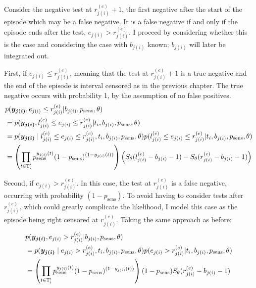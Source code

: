 \documentclass[thesis.tex]{subfiles}
\begin{document}
Consider the negative test at $r_{j(i)}^{(e)}+1$, the first negative after the start of the episode which may be a false negative.
It is a false negative if and only if the episode ends after the test, \ie $e_{j(i)} > r_{j(i)}^{(e)}$.
I proceed by considering whether this is the case and considering the case with $b_{j(i)}$ known; $b_{j(i)}$ will later be integrated out.

First, if $e_{j(i)} \leq r_{j(i)}^{(e)}$, meaning that the test at $r_{j(i)}^{(e)}+1$ is a true negative and the end of the episode is interval censored as in the previous chapter.
The true negative occurs with probability 1, by the assumption of no false positives.
\begin{align}
&p(\vec{y_{j(i)}}, e_{j(i)} \leq r_{j(i)}^{(e)} | b_{j(i)}, p_\text{sens}, \theta) \\
&= p(\vec{y_{j(i)}}, l_{j(i)}^{(e)} \leq e_{j(i)} \leq r_{j(i)}^{(e)} | t_i, b_{j(i)}, p_\text{sens}, \theta) \\ %
&= p(\vec{y_{j(i)}} \mid l_{j(i)}^{(e)} \leq e_{j(i)} \leq r_{j(i)}^{(e)}, t_i, b_{j(i)}, p_\text{sens}, \theta) p(l_{j(i)}^{(e)} \leq e_{j(i)} \leq r_{j(i)}^{(e)} | t_i, b_{j(i)}, p_\text{sens}, \theta) \\
&= \left( \prod_{t \in \sched'_i} p_\text{sens}^{y_{j(i)}(t)} (1 - p_\text{sens})^{(1 - y_{j(i)}(t))} \right) \left( S_\theta(l_{j(i)}^{(e)} - b_{j(i)} - 1) - S_\theta(r_{j(i)}^{(e)} - b_{j(i)} - 1) \right)
\label{imperf-test:eq:ll-ei-lt-ri}
\end{align}

Second, if $e_{j(i)} > r_{j(i)}^{(e)}$.
In this case, the test at $r_{j(i)}^{(e)}$ is a false negative, occurring with probability $(1 - p_\text{sens})$.
To avoid having to consider tests after $r_{j(i)}^{(e)}$, which could greatly complicate the likelihood, I model this case as the episode being right censored at $r_{j(i)}^{(e)}$.
Taking the same approach as before:
\begin{align}
&p(\bm{y_{j(i)}}, e_{j(i)} > r_{j(i)}^{(e)} | b_{j(i)}, p_\text{sens}, \theta) \\
&= p(\bm{y_{j(i)}} \mid e_{j(i)} > r_{j(i)}^{(e)}, t_i, b_{j(i)}, p_\text{sens}, \theta) p(e_{j(i)} > r_{j(i)}^{(e)} | t_i, b_{j(i)}, p_\text{sens}, \theta) \\
&= \left( \prod_{t \in \mathbb{T}'_i} p_\text{sens}^{y_{j(i)}(t)} (1 - p_\text{sens})^{(1 - y_{j(i)}(t))} \right) (1 - p_\text{sens}) S_\theta(r_{j(i)}^{(e)} - b_{j(i)} - 1)
\label{imperf-test:eq:ll-ei-gt-ri}
\end{align}
\end{document}
